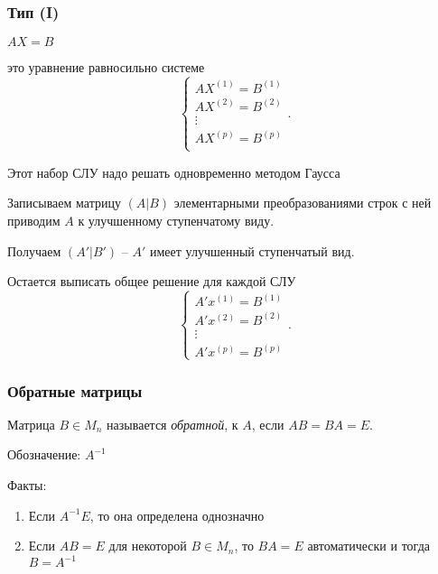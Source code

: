 \subsubsection{Тип (I)}

$AX = B$

это уравнение равносильно системе
\begin{equation*}
    \begin{cases}
        AX^{(1)} = B^{(1)} \\
        AX^{(2)} = B^{(2)} \\
        \vdots \\
        AX^{(p)} = B^{(p)} \\
    \end{cases}
.\end{equation*}

Этот набор СЛУ надо решать одновременно методом Гаусса

Записываем матрицу $(A|B)$ элементарными преобразованиями строк с ней приводим $A$ к улучшенному ступенчатому виду.

Получаем $(A' | B')$ -- $A'$ имеет улучшенный ступенчатый вид.

Остается выписать общее решение для каждой СЛУ 
\begin{equation*}
    \begin{cases}
        A' x^{(1)} = B^{(1)} \\
        A' x^{(2)} = B^{(2)} \\
        \vdots \\
        A' x^{(p)} = B^{(p)}
    \end{cases}
.\end{equation*}

\subsubsection{Обратные матрицы}

\begin{definition}
    Матрица $B \in M_n$ называется \textit{обратной}, к $A$, если $AB = BA = E$.

    Обозначение: $A^{-1}$
\end{definition}

Факты:
\begin{enumerate}
\item Если $A^{-1} E$, то она определена однозначно
\item Если $AB = E$ для некоторой $B \in M_n$, то $BA = E$ автоматически и тогда $B = A^{-1}$
\end{enumerate}

